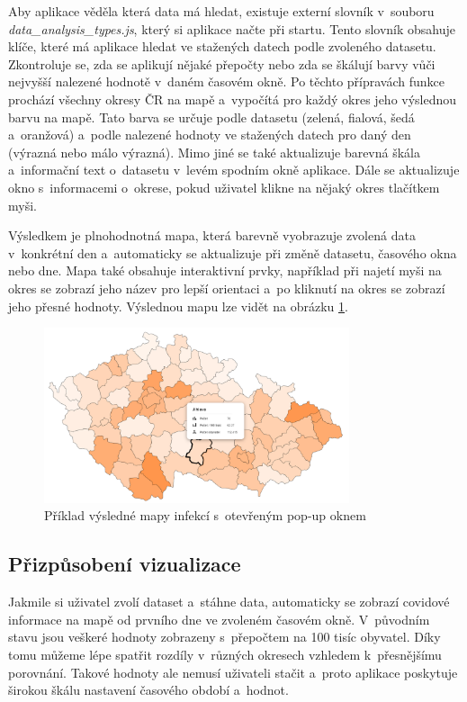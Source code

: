 Aby aplikace věděla která data má hledat, existuje externí slovník v~souboru \emph{data\_analysis\_types.js}, který si aplikace načte při startu. Tento slovník obsahuje klíče, které má aplikace hledat ve stažených datech podle zvoleného datasetu. Zkontroluje se, zda se aplikují nějaké přepočty nebo zda se škálují barvy vůči nejvyšší nalezené hodnotě v~daném časovém okně. Po těchto přípravách funkce prochází všechny okresy ČR na mapě a~vypočítá pro každý okres jeho výslednou barvu na mapě. Tato barva se určuje podle datasetu (zelená, fialová, šedá a~oranžová) a~podle nalezené hodnoty ve stažených datech pro daný den (výrazná nebo málo výrazná). Mimo jiné se také aktualizuje barevná škála a~informační text o~datasetu v~levém spodním okně aplikace. Dále se aktualizuje okno s~informacemi o~okrese, pokud uživatel klikne na nějaký okres tlačítkem myši.

Výsledkem je plnohodnotná mapa, která barevně vyobrazuje zvolená data v~konkrétní den a~automaticky se aktualizuje při změně datasetu, časového okna nebo dne. Mapa také obsahuje interaktivní prvky, například při najetí myši na okres se zobrazí jeho název pro lepší orientaci a~po kliknutí na okres se zobrazí jeho přesné hodnoty. Výslednou mapu lze vidět na obrázku \ref{fig:MapExample}.

\begin{figure}[h]
	\centering
	\includegraphics[width=0.8\textwidth]{Pictures/mapa.png}
	\caption{Příklad výsledné mapy infekcí s~otevřeným pop-up oknem}
	\label{fig:MapExample}
\end{figure}

\subsection{Přizpůsobení vizualizace}

Jakmile si uživatel zvolí dataset a~stáhne data, automaticky se zobrazí covidové informace na mapě od prvního dne ve zvoleném časovém okně. V~původním stavu jsou veškeré hodnoty zobrazeny s~přepočtem na 100 tisíc obyvatel. Díky tomu můžeme lépe spatřit rozdíly v~různých okresech vzhledem k~přesnějšímu porovnání. Takové hodnoty ale nemusí uživateli stačit a~proto aplikace poskytuje širokou škálu nastavení časového období a~hodnot.

